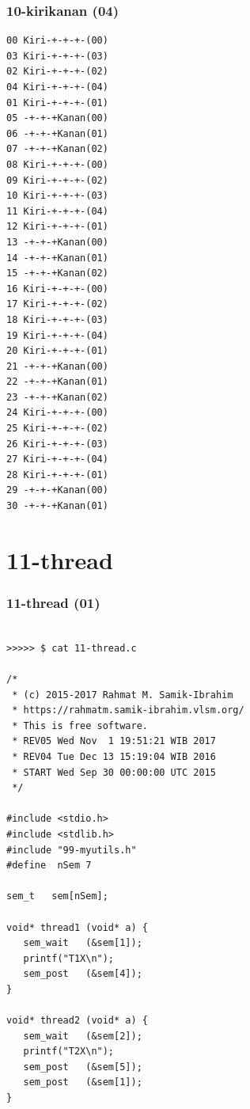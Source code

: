 \documentclass[aspectratio=169, xcolor=table, notheorems, hyperref={pdfpagelabels=false}]{beamer}
\begin{document}
\begin{frame}[fragile]
\frametitle{10-kirikanan (04)}
\begin{lstlisting}[basicstyle=\ttfamily\tiny]
00 Kiri-+-+-+-(00)
03 Kiri-+-+-+-(03)
02 Kiri-+-+-+-(02)
04 Kiri-+-+-+-(04)
01 Kiri-+-+-+-(01)
05 -+-+-+Kanan(00)
06 -+-+-+Kanan(01)
07 -+-+-+Kanan(02)
08 Kiri-+-+-+-(00)
09 Kiri-+-+-+-(02)
10 Kiri-+-+-+-(03)
11 Kiri-+-+-+-(04)
12 Kiri-+-+-+-(01)
13 -+-+-+Kanan(00)
14 -+-+-+Kanan(01)
15 -+-+-+Kanan(02)
16 Kiri-+-+-+-(00)
17 Kiri-+-+-+-(02)
18 Kiri-+-+-+-(03)
19 Kiri-+-+-+-(04)
20 Kiri-+-+-+-(01)
21 -+-+-+Kanan(00)
22 -+-+-+Kanan(01)
23 -+-+-+Kanan(02)
24 Kiri-+-+-+-(00)
25 Kiri-+-+-+-(02)
26 Kiri-+-+-+-(03)
27 Kiri-+-+-+-(04)
28 Kiri-+-+-+-(01)
29 -+-+-+Kanan(00)
30 -+-+-+Kanan(01)

\end{lstlisting}
\end{frame}

\section{11-thread}
\begin{frame}[fragile]
\frametitle{11-thread (01)}
\begin{lstlisting}[basicstyle=\ttfamily\tiny]

>>>>> $ cat 11-thread.c

/*
 * (c) 2015-2017 Rahmat M. Samik-Ibrahim
 * https://rahmatm.samik-ibrahim.vlsm.org/
 * This is free software.
 * REV05 Wed Nov  1 19:51:21 WIB 2017
 * REV04 Tue Dec 13 15:19:04 WIB 2016
 * START Wed Sep 30 00:00:00 UTC 2015
 */

#include <stdio.h>
#include <stdlib.h>
#include "99-myutils.h"
#define  nSem 7

sem_t	sem[nSem];

void* thread1 (void* a) {
   sem_wait   (&sem[1]);
   printf("T1X\n");
   sem_post   (&sem[4]);
}

void* thread2 (void* a) {
   sem_wait   (&sem[2]);
   printf("T2X\n");
   sem_post   (&sem[5]);
   sem_post   (&sem[1]);
}

\end{lstlisting}
\end{frame}
\end{document}

